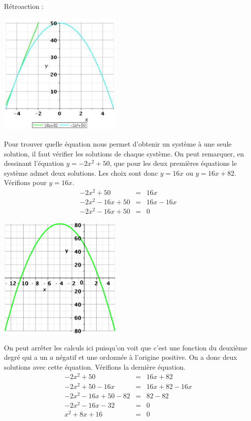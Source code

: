 \documentclass[letterpaper, 12pt]{article}
\begin{document}
R\'etroaction :\\
\begin{center}
 \includegraphics[width=6cm,bb=14 14 415 415]{Q2178.eps}
\end{center}
Pour trouver quelle \'equation nous permet d'obtenir un syst\`eme \`a une seule solution, il faut v\'erifier les solutions de chaque syst\`eme. On peut remarquer, en dessinant l'\'equation $y=-2x^{2}+50$, que pour les deux premi\`eres \'equations le syst\`eme admet deux solutions. Les choix sont donc $y=16x$ ou $y=16x+82$. V\'erifions pour $y=16x$.
\begin{eqnarray*}
 -2x^{2}+50 &=& 16x\\
-2x^{2}-16x+50 &=& 16x-16x\\
-2x^{2}-16x+50 &=& 0
\end{eqnarray*}
\begin{center}
 \includegraphics[width=6cm,bb=20 118 575 673]{Q2178a.eps}
\end{center}
On peut arr\^eter les calculs ici puisqu'on voit que c'est une fonction du deuxi\`eme degr\'e qui a un $a$ n\'egatif et une ordonn\'ee \`a l'origine positive. On a donc deux solutions avec cette \'equation. V\'erifions la derni\`ere \'equation.
\begin{eqnarray*}
 -2x^{2}+50 &=& 16x+82\\
 -2x^{2}+50-16x &=& 16x+82-16x\\
 -2x^{2}-16x +50-82 &=& 82-82\\
 -2x^{2}-16x -32 &=& 0\\
 x^{2}+8x+16 &=& 0
\end{eqnarray*}
\end{document}
